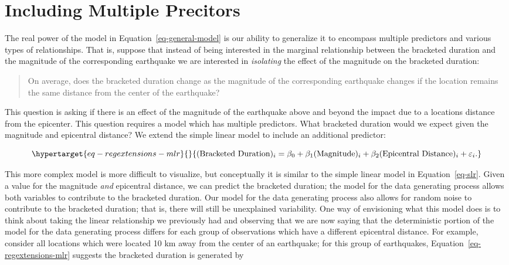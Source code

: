 \documentclass[
  letterpaper,
  DIV=11,
  numbers=noendperiod]{scrreprt}
\theoremstyle{plain}
\theoremstyle{definition}
\theoremstyle{definition}
\theoremstyle{remark}
\begin{document}
\hypertarget{including-multiple-precitors}{%
\section{Including Multiple
Precitors}\label{including-multiple-precitors}}

The real power of the model in Equation~\ref{eq-general-model} is our
ability to generalize it to encompass multiple predictors and various
types of relationships. That is, suppose that instead of being
interested in the marginal relationship between the bracketed duration
and the magnitude of the corresponding earthquake we are interested in
\emph{isolating} the effect of the magnitude on the bracketed duration:

\begin{quote}
On average, does the bracketed duration change as the magnitude of the
corresponding earthquake changes if the location remains the same
distance from the center of the earthquake?
\end{quote}

This question is asking if there is an effect of the magnitude of the
earthquake above and beyond the impact due to a locations distance from
the epicenter. This question requires a model which has multiple
predictors. What bracketed duration would we expect given the magnitude
and epicentral distance? We extend the simple linear model to include an
additional predictor:

\begin{equation}\protect\hypertarget{eq-regextensions-mlr}{}{(\text{Bracketed Duration})_i = \beta_0 + \beta_1(\text{Magnitude})_i + \beta_2(\text{Epicentral Distance})_i + \varepsilon_i.}\label{eq-regextensions-mlr}\end{equation}

This more complex model is more difficult to visualize, but conceptually
it is similar to the simple linear model in Equation~\ref{eq-slr}. Given
a value for the magnitude \emph{and} epicentral distance, we can predict
the bracketed duration; the model for the data generating process allows
both variables to contribute to the bracketed duration. Our model for
the data generating process also allows for random noise to contribute
to the bracketed duration; that is, there will still be unexplained
variability. One way of envisioning what this model does is to think
about taking the linear relationship we previously had and observing
that we are now saying that the deterministic portion of the model for
the data generating process differs for each group of observations which
have a different epicentral distance. For example, consider all
locations which were located 10 km away from the center of an
earthquake; for this group of earthquakes,
Equation~\ref{eq-regextensions-mlr} suggests the bracketed duration is
generated by
\end{document}
